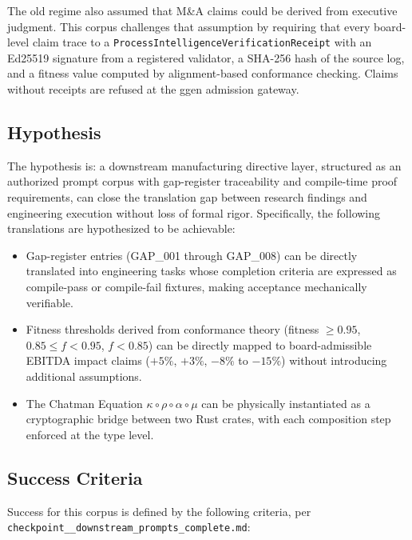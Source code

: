The old regime also assumed that M\&A claims could be derived from executive
judgment. This corpus challenges that assumption by requiring that every board-level
claim trace to a \texttt{ProcessIntelligenceVerificationReceipt} with an Ed25519
signature from a registered validator, a SHA-256 hash of the source log, and a
fitness value computed by alignment-based conformance checking. Claims without
receipts are refused at the ggen admission gateway.

\subsection{Hypothesis}
\label{sec:prompts-question-hypothesis}

The hypothesis is: a downstream manufacturing directive layer, structured as an
authorized prompt corpus with gap-register traceability and compile-time proof
requirements, can close the translation gap between research findings and engineering
execution without loss of formal rigor. Specifically, the following translations are
hypothesized to be achievable:

\begin{itemize}
  \item Gap-register entries (GAP\_001 through GAP\_008) can be directly translated
    into engineering tasks whose completion criteria are expressed as compile-pass
    or compile-fail fixtures, making acceptance mechanically verifiable.
  \item Fitness thresholds derived from conformance theory (fitness $\geq 0.95$,
    $0.85 \leq f < 0.95$, $f < 0.85$) can be directly mapped to board-admissible
    EBITDA impact claims ($+5\%$, $+3\%$, $-8\%$ to $-15\%$) without introducing
    additional assumptions.
  \item The Chatman Equation $\kappa \circ \rho \circ \alpha \circ \mu$ can be
    physically instantiated as a cryptographic bridge between two Rust crates, with
    each composition step enforced at the type level.
\end{itemize}

\subsection{Success Criteria}
\label{sec:prompts-question-success}

Success for this corpus is defined by the following criteria, per
\texttt{checkpoint\_\_downstream\_prompts\_complete.md}:

